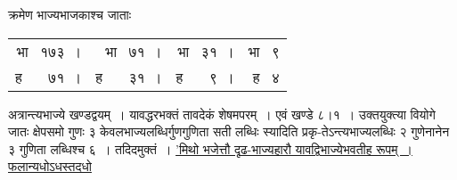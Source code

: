 \documentclass[11pt, openany]{book}
\begin{document}
\begin{sloppypar}
\noindent क्रमेण भाज्यभाजकाश्च जाताः

\begin{center}
\begin{tabular}{rrrr}
भा ~१७३~। & भा ~७१~। & भा ~३१~। & भा ~९\\
ह ~~~७१~। & ह ~~~३१~। & ह ~~~९~। & ह ~४
\end{tabular}
\end{center}

\noindent अत्रान्त्यभाज्ये खण्डद्वयम्~। यावद्धरभक्तं तावदेकं शेषमपरम्~। एवं खण्डे ८।१~। उक्तयुक्त्या वियोगे जातः क्षेपसमो गुणः ३ केवलभाज्यलब्धिर्गुणगुणिता सती लब्धिः स्यादिति प्रकृ-तेऽन्त्यभाज्यलब्धिः २ गुणेनानेन ३ गुणिता लब्धिश्च ६~। तदिदमुक्तं~। \hyperref[5.51]{'मिथो भजेत्तौ दृढ-भाज्यहारौ यावद्विभाज्येभवतीह रूपम्~। फलान्यधोऽधस्तदधो}
\end{sloppypar}

\newpage
\end{document}
